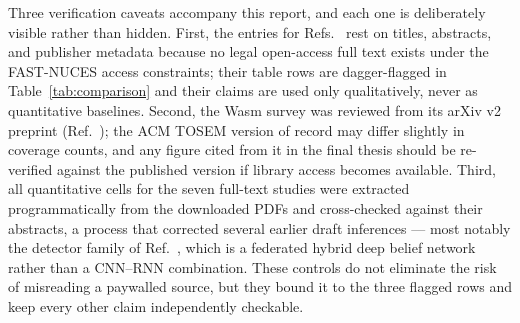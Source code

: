 \documentclass[11pt,a4paper]{article}
\begin{document}
Three verification caveats accompany this report, and each one is
deliberately visible rather than hidden. First, the entries for
Refs.~\cite{rezaei2025,bensaid2025,nandanwar2025} rest on titles,
abstracts, and publisher metadata because no legal open-access full text
exists under the FAST-NUCES access constraints; their table rows are
dagger-flagged in Table~\ref{tab:comparison} and their claims are used
only qualitatively, never as quantitative baselines. Second, the Wasm
survey was reviewed from its arXiv v2 preprint
(Ref.~\cite{zhang2025}); the ACM TOSEM version of record may differ
slightly in coverage counts, and any figure cited from it in the final
thesis should be re-verified against the published version if library
access becomes available. Third, all quantitative cells for the seven
full-text studies were extracted programmatically from the downloaded
PDFs and cross-checked against their abstracts, a process that corrected
several earlier draft inferences --- most notably the detector family of
Ref.~\cite{albogami2025}, which is a federated hybrid deep belief network
rather than a CNN--RNN combination. These controls do not eliminate the
risk of misreading a paywalled source, but they bound it to the three
flagged rows and keep every other claim independently checkable.
\end{document}
